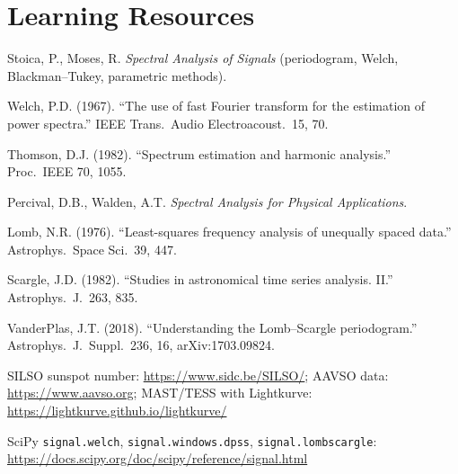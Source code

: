 \documentclass[11pt,a4paper]{article}
\begin{document}
\section*{Learning Resources}
\begin{resources}
  \item Stoica, P., Moses, R. \emph{Spectral Analysis of Signals} (periodogram, Welch, Blackman--Tukey, parametric methods).
  \item Welch, P.D. (1967). ``The use of fast Fourier transform for the estimation of power spectra.'' IEEE Trans.\ Audio Electroacoust.\ 15, 70.
  \item Thomson, D.J. (1982). ``Spectrum estimation and harmonic analysis.'' Proc.\ IEEE 70, 1055.
  \item Percival, D.B., Walden, A.T. \emph{Spectral Analysis for Physical Applications}.
\end{resources}
\begin{resources}
  \item Lomb, N.R. (1976). ``Least-squares frequency analysis of unequally spaced data.'' Astrophys.\ Space Sci.\ 39, 447.
  \item Scargle, J.D. (1982). ``Studies in astronomical time series analysis. II.'' Astrophys.\ J.\ 263, 835.
  \item VanderPlas, J.T. (2018). ``Understanding the Lomb--Scargle periodogram.'' Astrophys.\ J.\ Suppl.\ 236, 16, arXiv:1703.09824.
\end{resources}
\begin{resources}
  \item SILSO sunspot number: \url{https://www.sidc.be/SILSO/}; AAVSO data: \url{https://www.aavso.org}; MAST/TESS with Lightkurve: \url{https://lightkurve.github.io/lightkurve/}
  \item SciPy \texttt{signal.welch}, \texttt{signal.windows.dpss}, \texttt{signal.lombscargle}: \url{https://docs.scipy.org/doc/scipy/reference/signal.html}
\end{resources}

\evaluation
\end{document}
